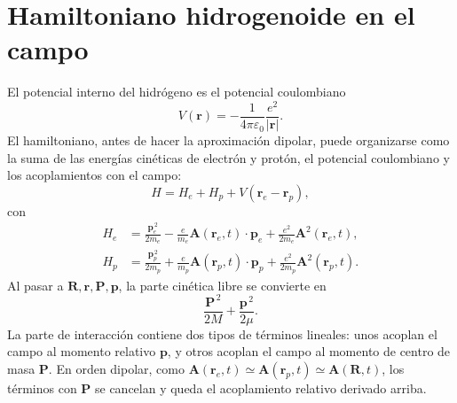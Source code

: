 \documentclass[11pt]{article}
\newcommand{\vb}[1]{\mathbf{#1}}
\begin{document}
\section{Hamiltoniano hidrogenoide en el campo}

El potencial interno del hidr\'ogeno es el potencial coulombiano
\begin{equation}
  V(\vb r)
  =
  -\frac{1}{4\pi\varepsilon_0}
  \frac{e^2}{|\vb r|}.
\end{equation}
El hamiltoniano, antes de hacer la aproximaci\'on dipolar, puede organizarse
como la suma de las energ\'ias cin\'eticas de electr\'on y prot\'on, el
potencial coulombiano y los acoplamientos con el campo:
\begin{equation}
  H
  =
  H_e+H_p+V(\vb r_e-\vb r_p),
\end{equation}
con
\begin{align}
  H_e
  &=
  \frac{\vb p_e^{\,2}}{2m_e}
  -
  \frac{e}{m_e}
  \vb A(\vb r_e,t)\cdot\vb p_e
  +
  \frac{e^2}{2m_e}
  \vb A^2(\vb r_e,t),                                                         \\
  H_p
  &=
  \frac{\vb p_p^{\,2}}{2m_p}
  +
  \frac{e}{m_p}
  \vb A(\vb r_p,t)\cdot\vb p_p
  +
  \frac{e^2}{2m_p}
  \vb A^2(\vb r_p,t).
\end{align}
Al pasar a \(\vb R,\vb r,\vb P,\vb p\), la parte cin\'etica libre se convierte
en
\begin{equation}
  \frac{\vb P^{\,2}}{2M}+\frac{\vb p^{\,2}}{2\mu}.
\end{equation}
La parte de interacci\'on contiene dos tipos de t\'erminos lineales: unos
acoplan el campo al momento relativo \(\vb p\), y otros acoplan el campo al
momento de centro de masa \(\vb P\). En orden dipolar, como
\(\vb A(\vb r_e,t)\simeq\vb A(\vb r_p,t)\simeq\vb A(\vb R,t)\), los t\'erminos
con \(\vb P\) se cancelan y queda el acoplamiento relativo derivado arriba.
\end{document}
